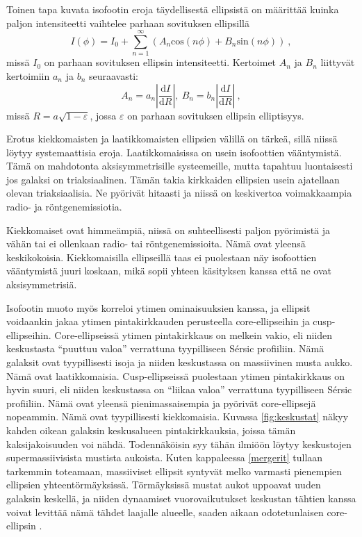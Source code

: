 \documentclass[12pt,a4paper]{article}
\begin{document}
Toinen tapa kuvata isofootin eroja täydellisestä ellipsistä on määrittää kuinka paljon intensiteetti vaihtelee parhaan sovituksen ellipsillä
\begin{equation}
I(\phi) = I_0 + \sum^\infty_{n=1}(A_n \mathrm{cos} (n \phi) + B_n \mathrm{sin} (n \phi)) \ ,
\end{equation}
missä $I_0$ on parhaan sovituksen ellipsin intensiteetti. Kertoimet $A_n$ ja $B_n$ liittyvät kertoimiin $a_n$ ja $b_n$ seuraavasti:
\begin{equation}
A_n = a_n \left| \frac{\mathrm{d}I}{\mathrm{d}R} \right|, \ B_n = b_n \left| \frac{\mathrm{d}I}{\mathrm{d}R} \right| \ ,
\end{equation}
missä $R=a \sqrt{1-\varepsilon}$, jossa $\varepsilon$ on parhaan sovituksen ellipsin elliptisyys.

Erotus kiekkomaisten ja laatikkomaisten ellipsien välillä on tärkeä, sillä niissä löytyy systemaattisia eroja. Laatikkomaisissa on usein isofoottien vääntymistä. Tämä on mahdotonta aksisymmetrisille systeemeille, mutta tapahtuu luontaisesti jos galaksi on triaksiaalinen. Tämän takia kirkkaiden ellipsien usein ajatellaan olevan triaksiaalisia. Ne pyörivät hitaasti ja niissä on keskivertoa voimakkaampia radio- ja röntgenemissiotia.
 
Kiekkomaiset ovat himmeämpiä, niissä on suhteellisesti paljon pyörimistä ja vähän tai ei ollenkaan radio- tai röntgenemissioita. Nämä ovat yleensä keskikokoisia. Kiekkomaisilla ellipseillä taas ei puolestaan näy isofoottien vääntymistä juuri koskaan, mikä sopii yhteen käsityksen kanssa että ne ovat aksisymmetrisiä. 

Isofootin muoto myös korreloi ytimen ominaisuuksien kanssa, ja ellipsit voidaankin jakaa ytimen pintakirkkauden perusteella core-ellipseihin ja cusp-ellipseihin. Core-ellipseissä ytimen pintakirkkaus on melkein vakio, eli niiden keskustasta ``puuttuu valoa'' verrattuna tyypilliseen Sérsic profiiliin. Nämä galaksit ovat tyypillisesti isoja ja niiden keskustassa on massiivinen musta aukko. Nämä ovat laatikkomaisia. Cusp-ellipseissä puolestaan ytimen pintakirkkaus on hyvin suuri, eli niiden keskustassa on ``liikaa valoa'' verrattuna tyypilliseen Sérsic profiiliin. Nämä ovat yleensä pienimassaisempia ja pyörivät core-ellipsejä nopeammin. Nämä ovat tyypillisesti kiekkomaisia. Kuvassa \ref{fig:keskustat} näkyy kahden oikean galaksin keskusalueen pintakirkkauksia, joissa tämän kaksijakoisuuden voi nähdä. Todennäköisin syy tähän ilmiöön löytyy keskustojen supermassiivisista mustista aukoista. Kuten kappaleessa \ref{mergerit} tullaan tarkemmin toteamaan, massiiviset ellipsit syntyvät melko varmasti pienempien ellipsien yhteentörmäyksissä. Törmäyksissä mustat aukot uppoavat uuden galaksin keskellä, ja niiden dynaamiset vuorovaikutukset keskustan tähtien kanssa voivat levittää nämä tähdet laajalle alueelle, saaden aikaan odotetunlaisen core-ellipsin \citep{rantala:2018}.
\end{document}

